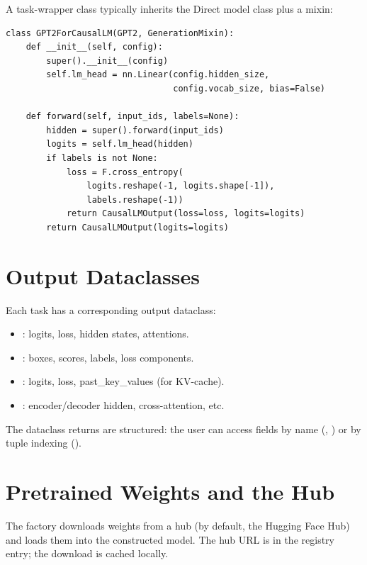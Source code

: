 A task-wrapper class typically inherits the Direct model class
plus a mixin:

\begin{lstlisting}[style=lucid,language=LucidPython]
class GPT2ForCausalLM(GPT2, GenerationMixin):
    def __init__(self, config):
        super().__init__(config)
        self.lm_head = nn.Linear(config.hidden_size,
                                 config.vocab_size, bias=False)

    def forward(self, input_ids, labels=None):
        hidden = super().forward(input_ids)
        logits = self.lm_head(hidden)
        if labels is not None:
            loss = F.cross_entropy(
                logits.reshape(-1, logits.shape[-1]),
                labels.reshape(-1))
            return CausalLMOutput(loss=loss, logits=logits)
        return CausalLMOutput(logits=logits)
\end{lstlisting}

\section{Output Dataclasses}
\label{sec:zoo_architecture:output_dataclasses}

Each task has a corresponding output dataclass:

\begin{itemize}
  \item {}: logits, loss, hidden
    states, attentions.
  \item {}: boxes, scores, labels,
    loss components.
  \item {}: logits, loss, past\_key\_values
    (for KV-cache).
  \item {}: encoder/decoder hidden,
    cross-attention, etc.
\end{itemize}

The dataclass returns are structured: the user can access fields
by name (, ) or by tuple
indexing ().

\section{Pretrained Weights and the Hub}
\label{sec:zoo_architecture:hub}

The  factory downloads weights from a hub
(by default, the Hugging Face Hub) and loads them into the
constructed model. The hub URL is in the registry entry; the
download is cached locally.

